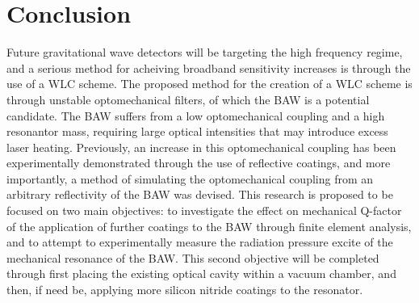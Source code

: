 \documentclass[aps,  
                a4paper, 
                amsmath, 
                amssymb, 
                preprint,
                tightenlines,  
                amsfonts,
                nofootinbib,
                onecolumn,
                titlepage,
                10pt
            ]{revtex4-2}
\begin{document}
    \section{Conclusion}
    Future gravitational wave detectors will be targeting the high frequency regime, and a serious method for acheiving broadband sensitivity increases is through the use of a WLC scheme. The proposed method for the creation of a WLC scheme is through unstable optomechanical filters, of which the BAW is a potential candidate. The BAW suffers from a low optomechanical coupling and a high resonantor mass, requiring large optical intensities that may introduce excess laser heating. Previously, an increase in this optomechanical coupling has been experimentally demonstrated through the use of reflective coatings, and more importantly, a method of simulating the optomechanical coupling from an arbitrary reflectivity of the BAW was devised. This research is proposed to be focused on two main objectives: to investigate the effect on mechanical Q-factor of the application of further coatings to the BAW through finite element analysis, and to attempt to experimentally measure the radiation pressure excite of the mechanical resonance of the BAW. This second objective will be completed through first placing the existing optical cavity within a vacuum chamber, and then, if need be, applying more silicon nitride coatings to the resonator. 
\end{document}
